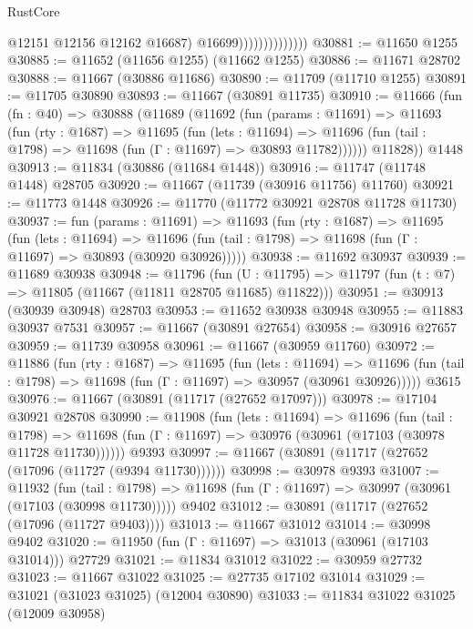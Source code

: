 \begin{lexlean}{RustCore}
\begin{coremodule}
                                  @12151
                                  @12156
                                  @12162
                                  @16687)
                                @16699))))))))))))))
@30881 := @11650 @1255
@30885 := @11652 (@11656 @1255) (@11662 @1255)
@30886 := @11671 @28702
@30888 := @11667 (@30886 @11686)
@30890 := @11709 (@11710 @1255)
@30891 := @11705 @30890
@30893 := @11667 (@30891 @11735)
@30910 := @11666
    (fun (fn : @40) =>
    @30888
      (@11689
        (@11692
          (fun (params : @11691) =>
          @11693
            (fun (rty : @1687) =>
            @11695
              (fun (lets : @11694) =>
              @11696 (fun (tail : @1798) => @11698 (fun (Γ : @11697) => @30893 @11782))))))
        @11828))
    @1448
@30913 := @11834 (@30886 (@11684 @1448))
@30916 := @11747 (@11748 @1448) @28705
@30920 := @11667 (@11739 (@30916 @11756) @11760)
@30921 := @11773 @1448
@30926 := @11770 (@11772 @30921 @28708 @11728 @11730)
@30937 := fun (params : @11691) =>
  @11693
    (fun (rty : @1687) =>
    @11695
      (fun (lets : @11694) =>
      @11696 (fun (tail : @1798) => @11698 (fun (Γ : @11697) => @30893 (@30920 @30926)))))
@30938 := @11692 @30937
@30939 := @11689 @30938
@30948 := @11796
    (fun (U : @11795) => @11797 (fun (t : @7) => @11805 (@11667 (@11811 @28705 @11685) @11822)))
@30951 := @30913 (@30939 @30948) @28703
@30953 := @11652 @30938 @30948
@30955 := @11883 @30937 @7531
@30957 := @11667 (@30891 @27654)
@30958 := @30916 @27657
@30959 := @11739 @30958
@30961 := @11667 (@30959 @11760)
@30972 := @11886
    (fun (rty : @1687) =>
    @11695
      (fun (lets : @11694) =>
      @11696 (fun (tail : @1798) => @11698 (fun (Γ : @11697) => @30957 (@30961 @30926)))))
    @3615
@30976 := @11667 (@30891 (@11717 (@27652 @17097)))
@30978 := @17104 @30921 @28708
@30990 := @11908
    (fun (lets : @11694) =>
    @11696
      (fun (tail : @1798) =>
      @11698 (fun (Γ : @11697) => @30976 (@30961 (@17103 (@30978 @11728 @11730))))))
    @9393
@30997 := @11667 (@30891 (@11717 (@27652 (@17096 (@11727 (@9394 @11730))))))
@30998 := @30978 @9393
@31007 := @11932
    (fun (tail : @1798) => @11698 (fun (Γ : @11697) => @30997 (@30961 (@17103 (@30998 @11730)))))
    @9402
@31012 := @30891 (@11717 (@27652 (@17096 (@11727 @9403))))
@31013 := @11667 @31012
@31014 := @30998 @9402
@31020 := @11950 (fun (Γ : @11697) => @31013 (@30961 (@17103 @31014))) @27729
@31021 := @11834 @31012
@31022 := @30959 @27732
@31023 := @11667 @31022
@31025 := @27735 @17102 @31014
@31029 := @31021 (@31023 @31025) (@12004 @30890)
@31033 := @11834 @31022 @31025 (@12009 @30958)

\end{coremodule}
\end{lexlean}
